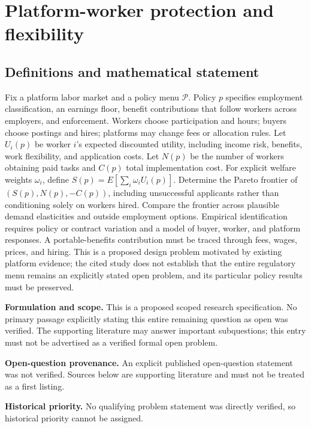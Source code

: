 \documentclass[11pt]{article}
\begin{document}
\section*{Platform-worker protection and flexibility}\label{30007639}
\subsection{Definitions and mathematical statement}
Fix a platform labor market and a policy menu \(\mathcal P\). Policy \(p\) specifies employment classification, an earnings floor, benefit contributions that follow workers across employers, and enforcement. Workers choose participation and hours; buyers choose postings and hires; platforms may change fees or allocation rules. Let \(U_i(p)\) be worker \(i\)'s expected discounted utility, including income risk, benefits, work flexibility, and application costs. Let \(N(p)\) be the number of workers obtaining paid tasks and \(C(p)\) total implementation cost. For explicit welfare weights \(\omega_i\), define \(S(p)=E[\sum_i\omega_iU_i(p)]\). Determine the Pareto frontier of \((S(p),N(p),-C(p))\), including unsuccessful applicants rather than conditioning solely on workers hired. Compare the frontier across plausible demand elasticities and outside employment options. Empirical identification requires policy or contract variation and a model of buyer, worker, and platform responses. A portable-benefits contribution must be traced through fees, wages, prices, and hiring. This is a proposed design problem motivated by existing platform evidence; the cited study does not establish that the entire regulatory menu remains an explicitly stated open problem, and its particular policy results must be preserved.

\par\textbf{Formulation and scope.} This is a proposed scoped research specification. No primary passage explicitly stating this entire remaining question as open was verified. The supporting literature may answer important subquestions; this entry must not be advertised as a verified formal open problem.

\par\textbf{Open-question provenance.} An explicit published open-question statement was not verified. Sources below are supporting literature and must not be treated as a first listing.

\par\textbf{Historical priority.} No qualifying problem statement was directly verified, so historical priority cannot be assigned.
\end{document}
